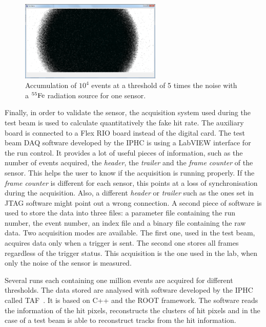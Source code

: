   \begin{figure}[!tbh]
    \centering
    \includegraphics[width=0.6\textwidth]{Pictures/labTests/10kEvents_Fe55_cut5sigma.png}
    \caption{Accumulation of $10^{4}$ events at a threshold of 5 times the noise with a $^{55}\rm{Fe}$ radiation source for one sensor.}
    \label{fig:fe55}
  \end{figure}

  Finally, in order to validate the sensor, the acquisition system used during the test beam is used to calculate quantitatively the fake hit rate.
  The auxiliary board is connected to a Flex RIO board instead of the digital card.
  The test beam \gls{DAQ} software developed by the \gls{IPHC} is using a LabVIEW interface for the run control.
  It provides a lot of useful pieces of information, such as the number of events acquired, the \textit{header}, the \textit{trailer} and the \textit{frame counter} of the sensor.
  This helps the user to know if the acquisition is running properly.
  If the \textit{frame counter} is different for each sensor, this points at a loss of synchronisation during the acquisition.
  Also, a different \textit{header} or \textit{trailer} such as the ones set in JTAG software might point out a wrong connection.
  A second  piece of software is used to store the data into three files: a parameter file containing the run number, the event number, an index file and a binary file containing the raw data.
  Two acquisition modes are available. 
  The first one, used in the test beam, acquires data only when a trigger is sent.
  The second one stores all frames regardless of the trigger status. 
  This acquisition is the one used in the lab, when only the noise of the sensor is measured.
   
  Several runs each containing one million events are acquired for different thresholds. 
  The data stored are analysed with software developed by the \gls{IPHC} called \gls{TAF}~\cite{TAF2015}.
  It is based on C++ and the ROOT framework.
  The software reads the information of the hit pixels, reconstructs the clusters of hit pixels and in the case of a test beam is able to reconstruct tracks from the hit information.

